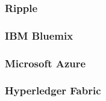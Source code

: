 \subsubsection{Ripple}

\subsubsection{IBM Bluemix}

\subsubsection{Microsoft Azure}

\subsubsection{Hyperledger Fabric}

\newpage